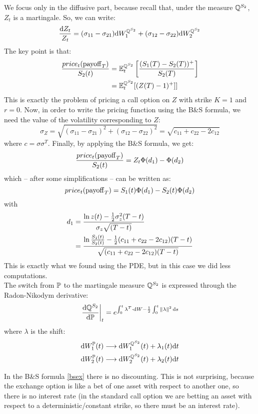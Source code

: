We focus only in the diffusive part, because recall that, under the measure $\mathbb{Q}^{S_2}$, $Z_t$ is a martingale. So, we can write:
\begin{equation}
    \frac{\dd Z_t}{Z_t} = (\sigma_{11}- \sigma_{21})\dd W_1^{\mathbb{Q}^{S_2}} + (\sigma_{12}- \sigma_{22})\dd W_2^{\mathbb{Q}^{S_2}}
\end{equation}
The key point is that:
\begin{align}
    \frac{price_t(\operatorname{payoff}_T)}{S_2(t)} &= \mathbb{E}_t^{\mathbb{Q}^{S_2}} \left[\frac{(S_1(T)-S_2(T))^+}{S_2(T)}\right]\\
    &=
    \mathbb{E}_t^{\mathbb{Q}^{S_2}}[(Z(T)-1)^+]]
\end{align}
This is exactly the problem of pricing a call option on $Z$ with strike $K=1$ and $r=0$. Now, in order to write the pricing function using the B\&S formula, we need the value of the volatility corresponding to $Z$:
\begin{equation}
    \sigma_Z = \sqrt{(\sigma_{11}- \sigma_{21})^2 + (\sigma_{12}- \sigma_{22})^2} = \sqrt{c_{11}+c_{22}-2c_{12}}
\end{equation}
where $c=\sigma\sigma^T$. Finally, by applying the B\&S formula, we get:
\begin{equation}
    \frac{price_t(\operatorname{payoff}_T)}{S_2(t)} = Z_t\Phi(d_1) - \Phi(d_2)
\end{equation}
which -- after some simplifications -- can be written as:
\begin{equation}
    price_t(\operatorname{payoff}_T) = S_1(t)\Phi(d_1) - S_2(t)\Phi(d_2)
\end{equation}
with
\begin{align}
    \notag d_1 &= \dfrac{\ln z(t)-\frac{1}{2}\sigma_z^2(T-t)}{\sigma_z \sqrt{(T-t)}} \\
    &=
    \dfrac{\ln\frac{S_1(t)}{S_2(t)}-\frac{1}{2}(c_{11}+c_{22}-2c_{12})(T-t)}{\sqrt{(c_{11}+c_{22}-2c_{12})(T-t)}}
\end{align}
This is exactly what we found using the PDE, but in this case we did less computations.\\ 
The switch from $\mathbb{P}$ to the martingale measure $\mathbb{Q}^{S_2}$ is expressed through the Radon-Nikodym derivative:
\begin{equation}\label{bsex}
    \eval{\frac{\dd\Qmeas^{S_2}}{\dd\Pmeas}}_t = e^{\int_0^t\lambda^T\cdot\dd W - \frac{1}{2}\int_0^t \norm{\lambda}^2\,\dd s} 
\end{equation}
where $\lambda$ is the shift:
\begin{align}
    \dd W_1^{\mathbb{P}}(t) &\longrightarrow \dd W_1^{\mathbb{Q}^{S_2}}(t) + \lambda_1(t)\dd t\\
    \dd W_2^{\mathbb{P}}(t) &\longrightarrow \dd W_2^{\mathbb{Q}^{S_2}}(t) + \lambda_2(t)\dd t
\end{align}
\begin{remark}
    In the B\&S formula \eqref{bsex} there is no discounting. This is not surprising, because the exchange option is like a bet of one asset with respect to another one, so there is no interest rate (in the standard call option we are betting an asset with respect to a deterministic/constant strike, so there must be an interest rate). 
\end{remark}

